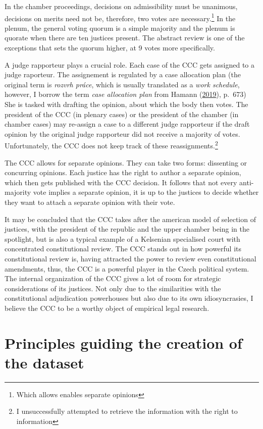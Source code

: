 \documentclass[
  11pt,
]{article}
\begin{document}
In the chamber proceedings, decisions on admissibility must be
unanimous, decisions on merits need not be, therefore, two votes are
necessary.\footnote{Which allows enables separate opinions} In the
plenum, the general voting quorum is a simple majority and the plenum is
quorate when there are ten justices present. The abstract review is one
of the exceptions that sets the quorum higher, at 9 votes more
specifically.

A judge rapporteur plays a crucial role. Each case of the CCC gets
assigned to a judge raporteur. The assignement is regulated by a case
allocation plan (the original term is \emph{rozvrh práce}, which is
usually translated as a \emph{work schedule}, however, I borrow the term
\emph{case allocation plan} from Hamann
(\protect\hyperlink{ref-hamannGermanFederalCourts2019}{2019}), p.~673)
She is tasked with drafting the opinion, about which the body then
votes. The president of the CCC (in plenary cases) or the president of
the chamber (in chamber cases) may re-assign a case to a different judge
rapporteur if the draft opinion by the original judge rapporteur did not
receive a majority of votes. Unfortunately, the CCC does not keep track
of these reassignments.\footnote{I unsuccessfully attempted to retrieve
  the information with the right to information}

The CCC allows for separate opinions. They can take two forms:
dissenting or concurring opinions. Each justice has the right to author
a separate opinion, which then gets published with the CCC decision. It
follows that not every anti-majority vote implies a separate opinion, it
is up to the justices to decide whether they want to attach a separate
opinion with their vote.

It may be concluded that the CCC takes after the american model of
selection of justices, with the president of the republic and the upper
chamber being in the spotlight, but is also a typical example of a
Kelsenian specialised court with concentrated constitutional review. The
CCC stands out in how powerful its constitutional review is, having
attracted the power to review even constitutional amendments, thus, the
CCC is a powerful player in the Czech political system. The internal
organization of the CCC gives a lot of room for strategic considerations
of its justices. Not only due to the similarities with the
constitutional adjudication powerhouses but also due to its own
idiosyncrasies, I believe the CCC to be a worthy object of empirical
legal research.

\hypertarget{principles-guiding-the-creation-of-the-dataset}{%
\section{Principles guiding the creation of the
dataset}\label{principles-guiding-the-creation-of-the-dataset}}
\end{document}
